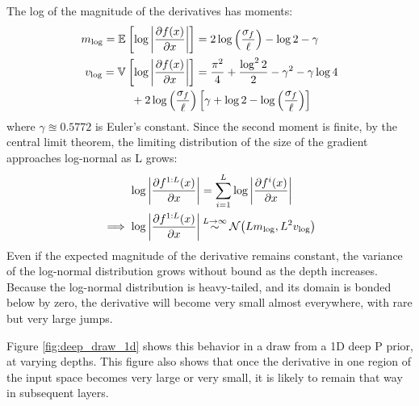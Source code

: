 \documentclass[twoside]{article}
\makeatletter
\newlength{\nonHumbleHeight}
\def\@humbleformat#1{{\settoheight{\nonHumbleHeight}{#1}\resizebox{!}{0.94\nonHumbleHeight}{#1}}}%
\def\humble#1{\@humbleformat{#1}}%
\newcommand{\gp}{{\humble GP}}
\makeatother
\begin{document}
The log of the magnitude of the derivatives has moments:
\begin{align}
m_{\log} = \expectargs{}{\log \left| \frac{\partial f(x)}{\partial x} \right|} & = 2 \log \left( \frac{\sigma_f}{\ell} \right) - \log2 - \gamma \\
v_{\log} = \varianceargs{}{\log \left| \frac{\partial f(x)}{\partial x} \right|} & = \frac{\pi^2}{4} + \frac{\log^2 2}{2}  - \gamma^2 - \gamma \log4 \nonumber \\
& \hspace{-2cm} + 2 \log\left(\frac{\sigma_f}{\ell}\right) \left[ \gamma + \log2 - \log \left(\frac{\sigma_f}{\ell}\right) \right]
\end{align}
where $\gamma \approxeq 0.5772$ is Euler's constant.  Since the second moment is finite, by the central limit theorem, the limiting distribution of the size of the gradient approaches log-normal as L grows:
\begin{align}
\log \left| \frac{\partial f^{1:L}(x)}{\partial x} \right| 
& = \sum_{i=1}^L \log \left| \frac{\partial f^i(x)}{\partial x} \right| \nonumber \\
 \implies
\log \left| \frac{\partial f^{1:L}(x)}{\partial x} \right| & \distas{L \rightarrow \infty} \Nt{ L m_{\log} }{L^2 v_{\log}}
\end{align}
%
Even if the expected magnitude of the derivative remains constant, the variance of the log-normal distribution grows without bound as the depth increases.  Because the log-normal distribution is heavy-tailed, and its domain is bonded below by zero, the derivative will become very small almost everywhere, with rare but very large jumps.  

Figure \ref{fig:deep_draw_1d} shows this behavior in a draw from a 1D deep \gp{} prior, at varying depths.  This figure also shows that once the derivative in one region of the input space becomes very large or very small, it is likely to remain that way in subsequent layers.
%
%
\end{document}
